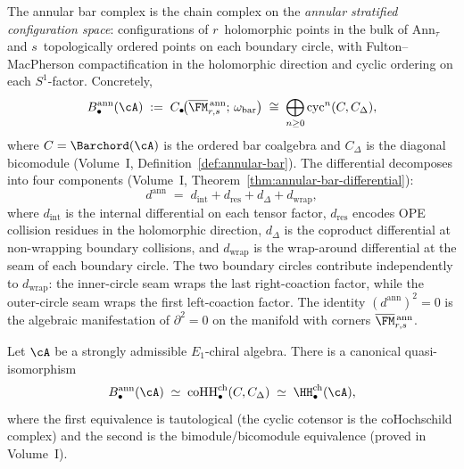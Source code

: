 \begin{construction}%
\label{constr:annular-bar-vol2}%
%
%
The annular bar complex is the chain complex on the
\emph{annular stratified configuration space}: configurations of
$r$~holomorphic points in the bulk of $\mathrm{Ann}_\tau$ and
$s$~topologically ordered points on each boundary circle,
with Fulton--MacPherson compactification in the holomorphic
direction and cyclic ordering on each $S^1$-factor.
Concretely,
\[
B^{\mathrm{ann}}_\bullet(\cA)
\;:=\;
C_\bullet\!\bigl(
\overline{\FM}{}^{\,\mathrm{ann}}_{r,s};\,
\omega_{\mathrm{bar}}
\bigr)
\;\cong\;
\bigoplus_{n\ge 0}
\mathrm{cyc}^n(C,C_\Delta),
\]
where $C=\Barchord(\cA)$ is the ordered bar coalgebra and
$C_\Delta$ is the diagonal bicomodule
\textup{(}Volume~I, Definition~\textup{\ref{def:annular-bar}}\textup{)}.
The differential decomposes into four components
\textup{(}Volume~I,
Theorem~\textup{\ref{thm:annular-bar-differential}}\textup{)}:
\[
d^{\mathrm{ann}}
\;=\;
d_{\mathrm{int}}+d_{\mathrm{res}}+d_\Delta+d_{\mathrm{wrap}},
\]
where $d_{\mathrm{int}}$ is the internal differential on each
tensor factor, $d_{\mathrm{res}}$ encodes OPE collision residues
in the holomorphic direction, $d_\Delta$ is the coproduct
differential at non-wrapping boundary collisions, and
$d_{\mathrm{wrap}}$ is the wrap-around differential at the seam
of each boundary circle. The two boundary circles contribute
independently to $d_{\mathrm{wrap}}$: the inner-circle seam wraps
the last right-coaction factor, while the outer-circle seam wraps
the first left-coaction factor. The identity
$(d^{\mathrm{ann}})^2=0$ is the algebraic manifestation of
$\partial^2=0$ on the manifold with corners
$\overline{\FM}{}^{\,\mathrm{ann}}_{r,s}$.
\end{construction}

\begin{theorem}%
\label{thm:annular-HH-vol2}%
%
%
Let $\cA$ be a strongly admissible $E_1$-chiral algebra. There
is a canonical quasi-isomorphism
\begin{equation}\label{eq:annular-HH-vol2}
B^{\mathrm{ann}}_\bullet(\cA)
\;\simeq\;
\operatorname{coHH}^{\mathrm{ch}}_\bullet(C,C_\Delta)
\;\simeq\;
\HH^{\mathrm{ch}}_\bullet(\cA),
\end{equation}
where the first equivalence is tautological
\textup{(}the cyclic cotensor is the coHochschild complex\textup{)}
and the second is the bimodule/bicomodule equivalence
\textup{(}proved in Volume~I\textup{)}.
\end{theorem}

